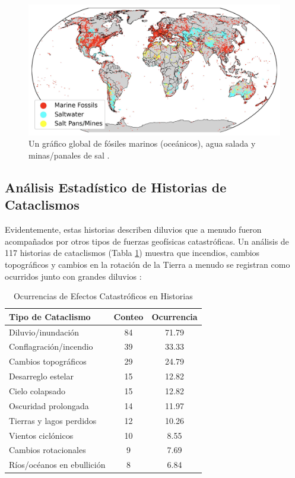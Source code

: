 \documentclass[10pt,twocolumn,letterpaper]{article}
\begin{document}
\begin{figure}[t]
\begin{center}
\includegraphics[width=1\textwidth]{marine.jpg}
\end{center}
   \caption{Un gráfico global de fósiles marinos (oceánicos), agua salada y minas/panales de sal \cite{15,16,86,87}.}
   \label{fig:2}
\end{figure}

\subsection{Análisis Estadístico de Historias de Cataclismos}

Evidentemente, estas historias describen diluvios que a menudo fueron acompañados por otros tipos de fuerzas geofísicas catastróficas. Un análisis de 117 historias de cataclismos (Tabla \ref{tab: 1}) muestra que incendios, cambios topográficos y cambios en la rotación de la Tierra a menudo se registran como ocurridos junto con grandes diluvios \cite{14}:

\begin{table}[ht]
\begin{center}
\renewcommand{\arraystretch}{1.2}  %
\begin{tabular}{|l|c|c|}
\hline
\textbf{Tipo de Cataclismo} & \textbf{Conteo} & \textbf{Ocurrencia} \\
\hline\hline
Diluvio/inundación         & 84 & 71.79 \\
Conflagración/incendio    & 39 & 33.33 \\
Cambios topográficos      & 29 & 24.79 \\
Desarreglo estelar        & 15 & 12.82 \\
Cielo colapsado           & 15 & 12.82 \\
Oscuridad prolongada        & 14 & 11.97 \\
Tierras y lagos perdidos    & 12 & 10.26 \\
Vientos ciclónicos         & 10 & 8.55  \\
Cambios rotacionales & 9 & 7.69  \\
Ríos/océanos en ebullición & 8 & 6.84 \\
\hline
\end{tabular}
\end{center}
\caption{Ocurrencias de Efectos Catastróficos en Historias}
\label{tab: 1}
\end{table}
\end{document}
